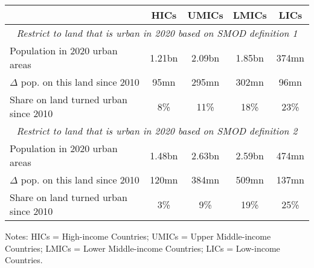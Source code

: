 
\begin{tabular}{lcccc}
\hline\hline
         & HICs & UMICs & LMICs & LICs \\
\hline
         \multicolumn{5}{c}{\it Restrict to land that is urban in 2020 based on SMOD definition 1}\\
\hline
     Population in 2020 urban areas         & 1.21bn & 2.09bn & 1.85bn & 374mn \\
     $\Delta$ pop. on this land since 2010  & 95mn   & 295mn  & 302mn  & 96mn \\
     Share on land turned urban since 2010  & 8\% & 11\% & 18\% & 23\% \\
\hline
         \multicolumn{5}{c}{\it Restrict to land that is urban in 2020 based on SMOD definition 2}\\
\hline
     Population in 2020 urban areas         & 1.48bn & 2.63bn & 2.59bn & 474mn \\
     $\Delta$ pop. on this land since 2010  & 120mn   & 384mn  & 509mn  & 137mn \\
     Share on land turned urban since 2010  & 3\% & 9\% & 19\% & 25\%\\
\hline\hline
\end{tabular}
\vspace{0.5em}
\begin{flushleft}
\footnotesize Notes: HICs = High-income Countries; UMICs = Upper Middle-income Countries; LMICs = Lower Middle-income Countries; LICs = Low-income Countries.
\end{flushleft}